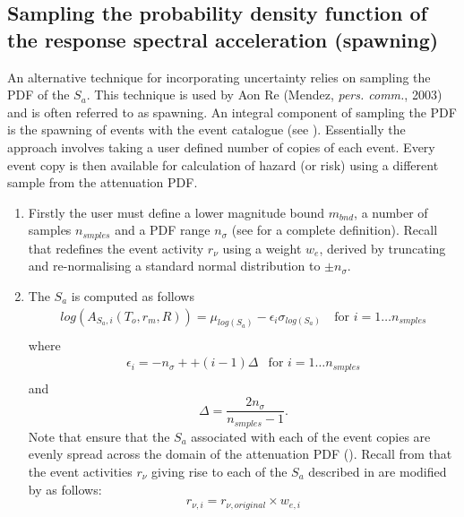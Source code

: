 \subsection{Sampling the probability density function of
the response spectral acceleration (spawning)} \label{attn:uncert-pdfchoice}


An alternative technique for incorporating uncertainty relies on
sampling the PDF of the $S_a$. This technique is used by Aon Re
(Mendez, \textit{pers. comm.}, 2003) and is often referred to as
spawning. An integral component of sampling the PDF is the spawning
of events with the event catalogue (see ).
Essentially the approach involves taking a user defined number of
copies of each event. Every event copy is then available for
calculation of hazard (or risk) using a different sample from the
attenuation PDF.
\begin{enumerate}
\item Firstly the user must define a lower magnitude bound
$m_{bnd}$, a number of samples $n_{smples}$ and a PDF range
$n_\sigma$ (see  for a complete definition).
Recall that  redefines the event activity
$r_\nu$ using a weight $w_e$, derived by truncating and
re-normalising a standard normal distribution to $\pm n_\sigma$.
\item The $S_a$ is computed as follows
\begin{equation}
\label{attn:uncertainty-pdfsample}
\begin{array}{ll}
log(A_{S_a,i}(T_o,r_m,R)) = \mu_{log(S_a)} - \epsilon_i
\sigma_{log(S_a)}\ & \textrm{for $i=1 \ldots
n_{smples}$} \\
\end{array}
\end{equation}
where
\begin{equation}
\label{attn:uncertainty-def-epsilon}
\begin{array}{ll}
\epsilon_i = -n_\sigma + + (i-1)\Delta &
\textrm{for $i=1 \ldots n_{smples}$} \\
\end{array}
\end{equation}
and
\begin{equation}
\Delta = \frac{2n_\sigma}{n_{smples}-1}.
\end{equation}
Note that
ensure that the $S_a$ associated with each of the event copies are
evenly spread across the domain of the attenuation PDF
(). Recall from 
that the event activities $r_\nu$ giving rise to each of the $S_a$
described in  are modified by
 as follows:
\begin{equation}
r_{\nu,i} = r_{\nu,original} \times w_{e,i}
\end{equation}
\end{enumerate}

